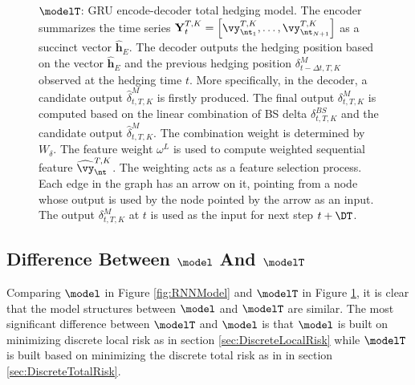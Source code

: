 \begin{figure}[htp!]
{
	}
	\caption{$\modelT$: GRU encode-decoder total hedging model. The encoder summarizes the time series $\mathbf{Y}_{t}^{T,K}=\left[\vy^{T,K}_{\nt_{1}},\dots,\vy^{T,K}_{\nt_{N+1}}\right]$ as a succinct  vector $\widehat{\mathbf{h}}_E$. The decoder outputs the hedging position based on the vector $\widehat{\mathbf{h}}_E$ and the previous hedging position $\delta^M_{t-\Delta t,T,K}$ observed at the hedging time $t$. More specifically, in the decoder, a candidate output $\widehat{\delta}^M_{t,T,K}$ is firstly produced. The final output $\delta^M_{t,T,K}$ is computed based on the linear combination of BS delta $\delta^{BS}_{t,T,K}$ and the candidate output  $\widehat{\delta}^M_{t,T,K}$. The combination weight is determined by  $W_{\delta}$. The feature weight $\omega^L$ is used to compute weighted sequential feature $\widehat{\vy}^{T,K}_{\nt}$. The weighting acts as a feature selection process.
		Each edge in the graph has an arrow on it, pointing from a node whose output is used by the node pointed by the arrow as an input. The output $\delta^M_{t,T,K}$ at $t$ is used as the input for next step $t+\DT$.}
	\label{fig:RNNModelTotal}
\end{figure}



\subsection{Difference Between  $\model$ And $\modelT$}
Comparing  $\model$  in Figure \ref{fig:RNNModel} and  $\modelT$  in Figure \ref{fig:RNNModelTotal}, it is clear that the model structures between $\model$ and $\modelT$ are similar. 
 The most significant difference between  $\modelT$ and  $\model$ is that $\model$ is built on minimizing discrete local risk as in section \ref{sec:DiscreteLocalRisk} while $\modelT$ is built based on minimizing the discrete total risk as in in section \ref{sec:DiscreteTotalRisk}.

